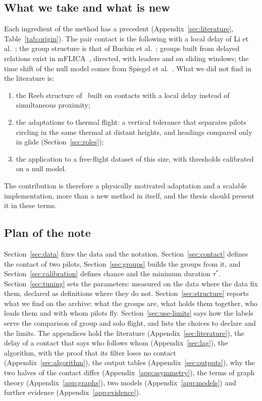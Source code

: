 \subsection{What we take and what is new}

Each ingredient of the method has a precedent (Appendix~\ref{sec:literature},
Table~\ref{tab:origin}). The pair contact is the following with a local delay of Li et
al.~\cite{li2013}; the group structure is that of Buchin et al.~\cite{buchin2015}; groups built
from delayed relations exist in mFLICA~\cite{amornbunchornvej2021}, directed, with leaders and on
sliding windows; the time shift of the null model comes from Spiegel et al.~\cite{spiegel2016}.
What we did not find in the literature is:
\begin{enumerate}[label=(\roman*)]
  \item the Reeb structure of~\cite{buchin2015} built on contacts with a local delay instead of
        simultaneous proximity;
  \item the adaptations to thermal flight: a vertical tolerance that separates pilots circling in
        the same thermal at distant heights, and headings compared only in glide
        (Section~\ref{sec:roles});
  \item the application to a free-flight dataset of this size, with thresholds calibrated on a
        null model.
\end{enumerate}
The contribution is therefore a physically motivated adaptation and a scalable implementation,
more than a new method in itself, and the thesis should present it in these terms.

\subsection{Plan of the note}

Section~\ref{sec:data} fixes the data and the notation. Section~\ref{sec:contact} defines the
contact of two pilots, Section~\ref{sec:groups} builds the groups from it, and
Section~\ref{sec:calibration} defines chance and the minimum duration $\tau^*$.
Section~\ref{sec:tuning} sets the parameters: measured on the data where the data fix them,
declared as definitions where they do not. Section~\ref{sec:structure} reports what we find on
the archive: what the groups are, what holds them together, who leads them and with whom pilots
fly. Section~\ref{sec:use-limits} says how the labels serve the comparison of group and solo
flight, and lists the choices to declare and the limits. The appendices hold the literature
(Appendix~\ref{sec:literature}), the delay of a contact that says who follows whom
(Appendix~\ref{sec:lag}), the algorithm, with the proof that its filter loses no contact
(Appendix~\ref{sec:algorithm}), the output tables (Appendix~\ref{sec:outputs}), why the two halves
of the contact differ (Appendix~\ref{app:asymmetry}), the terms of graph theory
(Appendix~\ref{app:graphs}), two models (Appendix~\ref{app:models}) and further evidence
(Appendix~\ref{app:evidence}).
